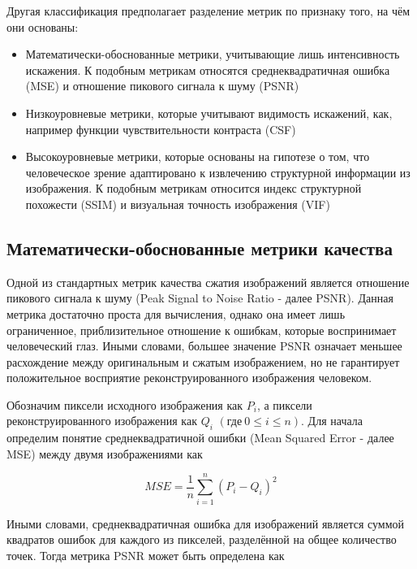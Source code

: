 Другая классификация предполагает разделение метрик по признаку того, на чём они
основаны\cite[6]{FullReferenceIQMetrics}:

\begin{itemize}
    \item Математически-обоснованные метрики, учитывающие лишь интенсивность
    искажения. К подобным метрикам относятся среднеквадратичная ошибка (MSE) и
    отношение пикового сигнала к шуму (PSNR)
    \item Низкоуровневые метрики, которые учитывают видимость искажений, как,
    например функции чувствительности контраста (CSF)
    \item Высокоуровневые метрики, которые основаны на гипотезе о том, что
    человеческое зрение адаптировано к извлечению структурной информации из
    изображения. К подобным метрикам относится индекс структурной похожести
    (SSIM) и визуальная точность изображения (VIF)
\end{itemize}

\subsection{Математически-обоснованные метрики качества}

Одной из стандартных метрик качества сжатия изображений является отношение
пикового сигнала к шуму (Peak Signal to Noise Ratio - далее PSNR). Данная
метрика достаточно проста для вычисления, однако она имеет лишь ограниченное,
приблизительное отношение к ошибкам, которые воспринимает человеческий глаз.
Иными словами, большее значение PSNR означает меньшее расхождение между
оригинальным и сжатым изображением, но не гарантирует положительное восприятие
реконструированного изображения человеком\cite[279]{DataCompression}.

Обозначим пиксели исходного изображения как $P_{i}$, а пиксели
реконструированного изображения как $Q_{i}$ $\left(\text{где} \ 0 \le i \le
n\right)$. Для начала определим понятие среднеквадратичной ошибки (Mean Squared
Error - далее MSE) между двумя изображениями как

\begin{equation} \label{eq:img_mse}
    MSE = \frac{1}{n} \sum_{i=1}^{n}\left(P_{i} - Q_{i}\right)^2
\end{equation}

Иными словами, среднеквадратичная ошибка для изображений является суммой
квадратов ошибок для каждого из пикселей, разделённой на общее количество точек.
Тогда метрика PSNR может быть определена как

